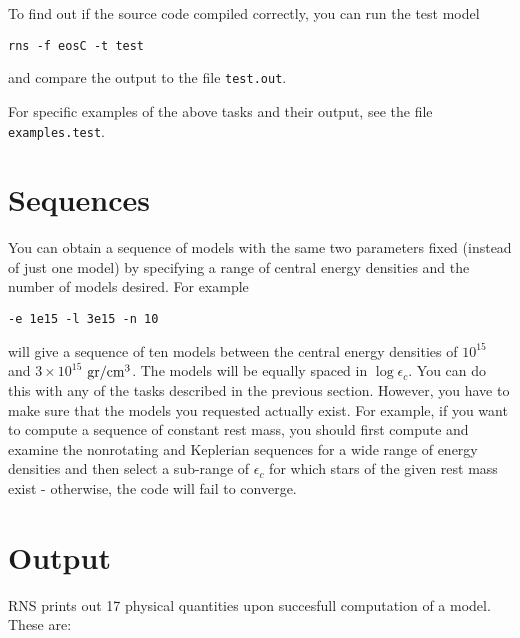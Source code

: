 \vspace{0.2cm}

\<To find out if the source code compiled correctly, you can run the test model
 
\vspace{0.2cm}

{\tt rns -f eosC -t test}

\vspace{0.2cm}

\<and compare the output to the file {\tt test.out}.

\vspace{0.2cm}

For specific examples of the above tasks and their output, see the
file {\tt examples.test}. 


\section{Sequences}

You can obtain a sequence of models with the same two parameters fixed 
(instead of just one model) by specifying a range of central energy 
densities and the number of models desired. For example

\vspace{0.2cm}

{\tt -e 1e15 -l 3e15 -n 10}

\vspace{0.2cm}

\<will give a sequence of ten models between the central energy densities
of $10^{15}$ and $3 \times 10^{15}$ ${\rm gr/cm^3}$. The models will be
equally spaced in $\log \epsilon_c$. You can do this with any of the
tasks described in the previous section. However, you have to make sure
that the models you requested actually exist. For example, if you want to 
compute a sequence of constant rest mass, you should first compute and 
examine the nonrotating and Keplerian sequences for a wide range of energy 
densities and then select a sub-range of $\epsilon_c$ for which stars of the 
given rest mass exist - otherwise, the code will fail to converge.
 
\section{Output}

RNS prints out 17 physical quantities upon succesfull computation of a model.
These are:

